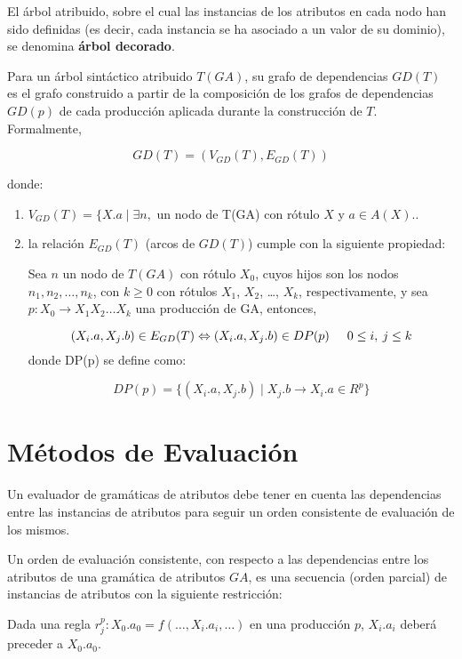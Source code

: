\begin{definition} 
\label{def:ast-attr}
El árbol atribuido, sobre el cual las instancias de los atributos en cada nodo han sido definidas (es decir, cada instancia se ha asociado a un valor de su dominio), se
denomina \textbf{árbol decorado}.
\end{definition}

\begin{definition} Para un árbol sintáctico atribuido $ T(GA) $, su grafo de dependencias $ GD(T) $ es el grafo construido a partir de la composición de los grafos de dependencias $ GD(p) $ de cada producción aplicada durante la construcción de $T$. Formalmente,

$$ GD(T)=(V_{GD}(T),E_{GD}(T)) $$

donde:

\begin{enumerate}
\item $ V_{GD}(T) = \{ X.a \mid \exists n, $ un nodo de T(GA) con 
      rótulo $ X $ y $a \in A(X)$..
      
\item la relación $ E_{GD}(T) $ (arcos de $ GD(T) $) cumple con la siguiente 
      propiedad:

      Sea $n$ un nodo de $T(GA)$ con rótulo $X_0$, cuyos hijos son los nodos
      $ n_1, n_2, \ldots ,n_k $, con $ k \geq 0 $ con rótulos 
      $ X_1 $, $ X_2 $, \ldots, $ X_k $, respectivamente, y sea 
      $p:X_0 \rightarrow X_1 X_2 \ldots X_k$ una producción de GA, entonces,
      
      $$ (X_{i}.a,X_{j}.b) \in E_{GD}(T) \Leftrightarrow 
         (X_{i}.a,X_{j}.b) \in DP(p) \hspace{.5cm} 0 \leq i, \: j \leq k $$
donde DP(p) se define como:

$$ DP(p) = \{ (X_i.a,X_j.b) \mid X_j.b \rightarrow X_i.a \in R^p \} $$

\end{enumerate}
\end{definition}

\section{Métodos de Evaluación}

Un evaluador de gramáticas de atributos debe tener en cuenta las dependencias entre las instancias de atributos para seguir un orden consistente de evaluación de los mismos.
\begin{definition} Un orden de evaluación consistente, con respecto a las dependencias entre los 
atributos de una gramática de atributos $ GA $, es una secuencia (orden parcial) de instancias de atributos
con la siguiente restricción:

Dada una regla $r_j^p:X_0.a_0=f(\ldots,X_i.a_i,\ldots)$ en una producción $p$, 
$X_i.a_i$ deberá preceder a $X_0.a_0$.
\end{definition}

